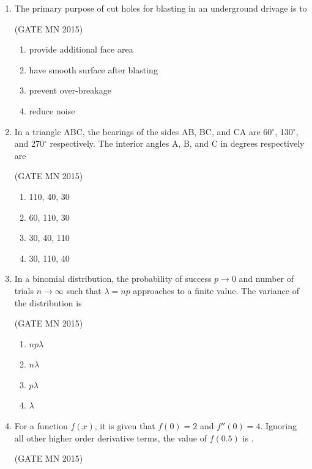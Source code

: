 \documentclass[journal]{IEEEtran}
\begin{document}
\begin{enumerate}
\item The primary purpose of cut holes for blasting in an underground drivage is to  


	\hfill(GATE MN 2015)
\begin{enumerate}
\item provide additional face area  
\item have smooth surface after blasting  
\item prevent over-breakage  
\item reduce noise  
\end{enumerate}

\item In a triangle ABC, the bearings of the sides AB, BC, and CA are 60$^\circ$, 130$^\circ$, and 270$^\circ$ respectively. The interior angles A, B, and C in degrees respectively are 

	\hfill(GATE MN 2015)
\begin{multicols}{2}
\begin{enumerate}
\item 110, 40, 30  
\item 60, 110, 30  
\item 30, 40, 110  
\item 30, 110, 40  
\end{enumerate}
\end{multicols}

\item In a binomial distribution, the probability of success $p \to 0$ and number of trials $n \to \infty$ such that $\lambda = np$ approaches to a finite value. The variance of the distribution is 

	\hfill(GATE MN 2015)
\begin{multicols}{4}
\begin{enumerate}
\item $np\lambda$  
\item $n\lambda$  
\item $p\lambda$  
\item $\lambda$  
\end{enumerate}
\end{multicols}

\item For a function $f(x)$, it is given that $f(0)=2$ and $f''(0)=4$. Ignoring all other higher order derivative terms, the value of $f(0.5)$ is \underline{\hspace{2cm}}.  

	\hfill(GATE MN 2015)



\end{enumerate}
\end{document}
